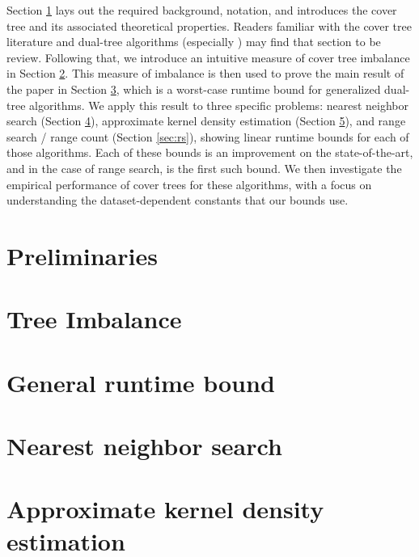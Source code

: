 \documentclass{article} %
\begin{document}
Section \ref{sec:preliminaries} lays out the required background, notation, and
introduces the cover tree and its associated theoretical properties.  Readers
familiar with the cover tree literature and dual-tree algorithms (especially
\cite{curtin2013tree}) may find that section to be review.  Following that, we
introduce an intuitive measure of cover tree imbalance in Section
\ref{sec:imbalance}.  This measure of imbalance is then used to prove the main
result of the paper in Section \ref{sec:bound}, which is a worst-case runtime
bound for generalized dual-tree algorithms.  We apply this result to three
specific problems: nearest neighbor search (Section \ref{sec:nns}), approximate
kernel density estimation (Section \ref{sec:akde}), and range search / range
count (Section \ref{sec:rs}), showing linear runtime bounds for each of those
algorithms.  Each of these bounds is an improvement on the state-of-the-art, and
in the case of range search, is the first such bound.  We then investigate the
empirical performance of cover trees for these algorithms, with a focus on
understanding the dataset-dependent constants that our bounds use.

\section{Preliminaries}
\label{sec:preliminaries}



\section{Tree Imbalance}
\label{sec:imbalance}



\section{General runtime bound}
\label{sec:bound}



\section{Nearest neighbor search}
\label{sec:nns}



\section{Approximate kernel density estimation}
\label{sec:akde}
\end{document}
